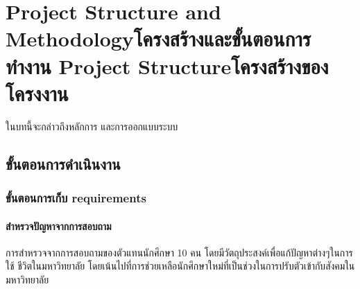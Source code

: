 \chapter{\ifproject%
\ifenglish Project Structure and Methodology\else โครงสร้างและขั้นตอนการทำงาน\fi
\else%
\ifenglish Project Structure\else โครงสร้างของโครงงาน\fi
\fi
}

ในบทนี้จะกล่าวถึงหลักการ และการออกแบบระบบ

\makeatletter


\makeatother

\section{ขั้นตอนการดําเนินงาน}

\subsection{ขั้นตอนการเก็บ requirements}
\subsubsection{สำหรวจปัญหาจากการสอบถาม}
\quad \quad การสําหรวจจากการสอบถามของตัวแทนนักศึกษา 10 คน โดยมีวัตถุประสงค์เพื่อแก้ปัญหาต่างๆในการใช้
ชีวิตในมหาวิทยาลัย โดยเน้นไปที่การช่วยเหลือนักศึกษาใหม่ที่เป็นช่วงในการปรับตัวเข้ากับสังคมในมหาวิทยาลัย

